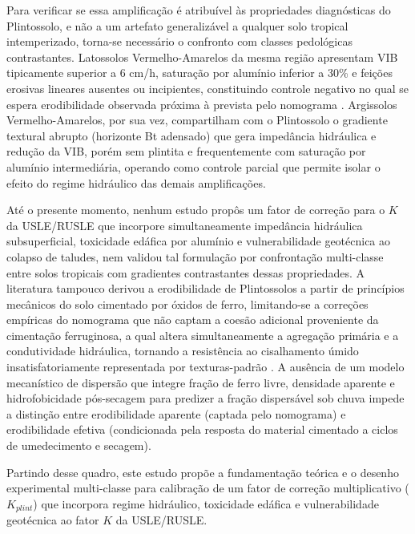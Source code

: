 \documentclass[
  brazilian,
  authoryear,
  preprint]{elsarticle}
\begin{document}
Para verificar se essa amplificação é atribuível às propriedades
diagnósticas do Plintossolo, e não a um artefato generalizável a
qualquer solo tropical intemperizado, torna-se necessário o confronto
com classes pedológicas contrastantes. Latossolos Vermelho-Amarelos da
mesma região apresentam VIB tipicamente superior a 6 cm/h, saturação por
alumínio inferior a 30\% e feições erosivas lineares ausentes ou
incipientes, constituindo controle negativo no qual se espera
erodibilidade observada próxima à prevista pelo nomograma
\citep{silva_et_al_2009, bertoni_lombardi_neto_2017}. Argissolos
Vermelho-Amarelos, por sua vez, compartilham com o Plintossolo o
gradiente textural abrupto (horizonte Bt adensado) que gera impedância
hidráulica e redução da VIB, porém sem plintita e frequentemente com
saturação por alumínio intermediária, operando como controle parcial que
permite isolar o efeito do regime hidráulico das demais amplificações.

Até o presente momento, nenhum estudo propôs um fator de correção para o
\(K\) da USLE/RUSLE que incorpore simultaneamente impedância hidráulica
subsuperficial, toxicidade edáfica por alumínio e vulnerabilidade
geotécnica ao colapso de taludes, nem validou tal formulação por
confrontação multi-classe entre solos tropicais com gradientes
contrastantes dessas propriedades. A literatura tampouco derivou a
erodibilidade de Plintossolos a partir de princípios mecânicos do solo
cimentado por óxidos de ferro, limitando-se a correções empíricas do
nomograma que não captam a coesão adicional proveniente da cimentação
ferruginosa, a qual altera simultaneamente a agregação primária e a
condutividade hidráulica, tornando a resistência ao cisalhamento úmido
insatisfatoriamente representada por texturas-padrão
\citep{alewell_et_al_2019}. A ausência de um modelo mecanístico de
dispersão que integre fração de ferro livre, densidade aparente e
hidrofobicidade pós-secagem para predizer a fração dispersável sob chuva
impede a distinção entre erodibilidade aparente (captada pelo nomograma)
e erodibilidade efetiva (condicionada pela resposta do material
cimentado a ciclos de umedecimento e secagem).

Partindo desse quadro, este estudo propõe a fundamentação teórica e o
desenho experimental multi-classe para calibração de um fator de
correção multiplicativo (\(K_{plint}\)) que incorpora regime hidráulico,
toxicidade edáfica e vulnerabilidade geotécnica ao fator \(K\) da
USLE/RUSLE.
\end{document}

